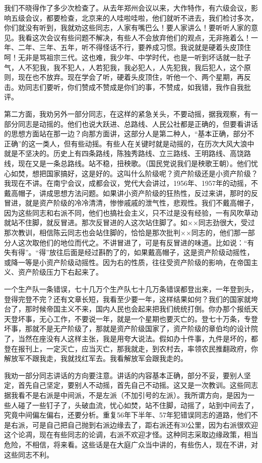 我们不晓得作了多少次检查了。从去年郑州会议以来，大作特作，有六级会议，影响五级会议，都要检查，北京来的人哇啦哇啦，他们就听不进去，我们检讨多次，你们就没有听到，我就劝这些同志，人家有嘴巴么！要人家讲么！要听听人家的意见。我看这次会议有些问题不解决，有些人不会放弃他们的观点，无非拖着么！一年、二年、三年、五年，听不得怪话不行，要养成习惯。我说就是硬着头皮顶住呵！无非是骂祖宗三代。这也难，我少年、中学时代，也是一听到坏话就一肚子气，人不犯我，我不犯人，人若犯我，我必犯人，人先犯我，我后犯人，这个原则，现在也不放弃。现在学会了听，硬着头皮顶住，听他一个、两个星期，再反击。劝同志们要听，你们赞成不赞成是你们的事，不赞成，如我错，我作自我批评。

第二方面，我劝另外一部分同志，在这样的紧急关头，不要动摇，据我观察，有一部分同志是动摇的。他们也说大跃进、总路线、人民公社都是正确的，但要看讲话的思想方面站在那一边？向那方面讲，这部分人是第二种人，“基本正确，部分不正确”的这一类人，但有些动摇。有些人在关键时就是动摇的，在历次大风大浪中就是不坚决的。历史上有四条路线，陈独秀路线、立三路线、王明路线、高饶路线，现在又是一条总路线。站不稳，扭秧歌。（国民党说我们是秧歌王朝）。他们忧心如焚，想把国家搞好，这是好的。这叫什么阶级呢？资产阶级还是小资产阶级？我现在不讲。在南宁会议，成都会议，党代大会讲过，1956年、1957年的动摇，不戴高帽子，讲成思想方法问题。如果讲小资产阶级的狂热性，反过来讲，那时的反冒进，就是资产阶级的冷冷清清，惨惨戚戚的泄气性，悲观性。我们不戴高帽子，因为这些同志和右派不同，他们也搞社会主义，只不过是没有经验，一有风吹草动就站不住脚，就反冒进。那次反冒进的人这次站住脚了。如××同志劲很大，受过那次教训，相信陈云同志也会站住脚的，恰恰是那次批判××同志的，他们那一部分人这次取他们的地位而代之。不讲冒进了，可是有反冒进的味道。比如说：“有失有得”。“得”放往后面是经过斟酌了的，如果戴高帽子，这是资产阶级动摇性，或降一等是小资产阶级动摇性。因为右的性质，往往受资产阶级的影响，在帝国主义、资产阶级压力下右起来了。

一个生产队一条错误，七十几万个生产队七十几万条错误都登出来，一年登到头，登得完登不完？还有文章长短，我看至少要一年，这样结果如何？我们的国家就垮台了，那时候帝国主义不来，国内人民也会起来把我们统统打倒。你办那个报纸天天登坏事，无心工作，不要说一年，就是一个星期也要灭亡的。登七十万条，专登坏事，那就不是无产阶级了，那就是资产阶级国家了，资产阶级的章伯均的设计院了，当然在座没有人这样主张，我是用夸大说法。假如办十件事，九件是坏的，都登在报刊上，一定灭亡，应当灭亡，那我就走，到农村去，率领农民推翻政府，你解放军不跟我走，我就找红军去。我看解放军会跟我走的。

我劝一部分同志讲话的方向要注意。讲话的内容基本正确，部分不妥，要别人坚定，首先自己坚定，要别人不动摇，首先自己不动摇。这又是一次教训。这些同志据我看不是右派是中间派，不是左派（不加引号的左派）。我所谓方向，是因为一些人碰了一些钉子了，头破血流，忧心如焚，站不住脚，动摇了，站到中间去了，究竟中间偏左偏右，还要分析。重复56年下半年、57年犯错误同志的道路，他们不是右派，可是自己把自己抛到右派边缘去了，距右派还有30公里，因为右派很欢迎这个论凋，现在有些同志的论调，右派不欢迎才怪。这种同志采取边缘政策，相当危险，不相信，将来看。这些话是在大庭广众当中讲的，有些伤人，现在不讲，对这些同志不利。


